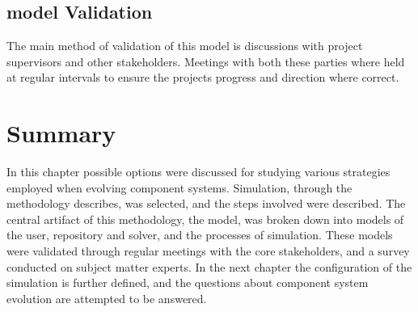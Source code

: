\subsection{\usermodel model Validation}
The main method of validation of this model is discussions with project supervisors and other stakeholders. 
Meetings with both these parties where held at regular intervals to ensure the projects progress and direction where correct.


\section{Summary}
{}In this chapter possible options were discussed for studying various strategies employed when evolving component systems.
{}Simulation, through the methodology \citep{Law2005} describes, was selected, and the steps involved were described.
{}The central artifact of this methodology, the \usermodel model, was broken down into models of the user, repository and solver, and the processes of simulation.
{}These models were validated through regular meetings with the core stakeholders, and a survey conducted on subject matter experts.
{}In the next chapter the configuration of the simulation is further defined, and the questions about component system evolution are attempted to be answered.

